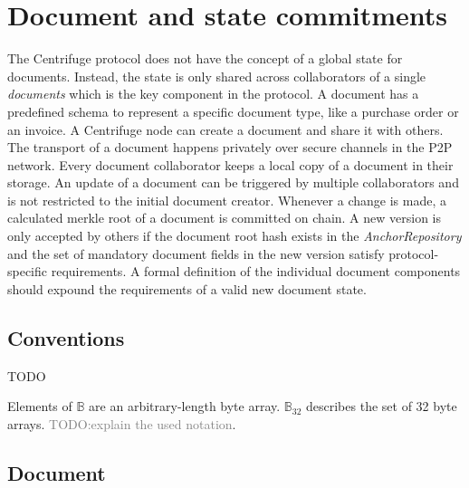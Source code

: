 \section{Document and state commitments}\label{sec:doc_state_comm}

The Centrifuge protocol does not have the concept of a global state for documents. Instead, the state is only shared across collaborators of a single \textit{documents} which is the key component in the protocol.
A document has a predefined schema to represent a specific document type, like a purchase order or an invoice. A Centrifuge node can create a document and share it with others. The transport of a document happens privately over secure channels in the P2P network. Every document collaborator keeps a local copy of a document in their storage. An update of a document can be triggered by multiple collaborators and is not restricted to the initial document creator. Whenever a change is made, a
calculated merkle root of a document is committed on chain. A new version is only accepted by others if the document root hash exists in the \textit{AnchorRepository} and the set of mandatory document fields in the new version satisfy protocol-specific requirements.  A formal definition of the individual document components should expound the requirements of a valid new document state. 
\newline
\subsection{Conventions}
TODO

Elements of $\mathbb{B}$ are an arbitrary-length byte array. $\mathbb{B}_{32}$ describes the set of 32 byte arrays. 
\textcolor{gray}{TODO:explain the used notation}.
\subsection{Document}
